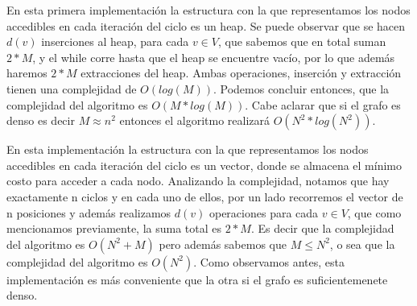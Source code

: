 \pagebreak



En esta primera implementación la estructura con la que representamos los nodos accedibles en cada iteración del ciclo es un heap. 
Se puede observar que se hacen $d(v)$ inserciones al heap, para cada $v \in V$, que sabemos que en total suman $2 * M$, y el while corre hasta que el heap se encuentre vacío, por lo que además haremos $2 * M$ extracciones del heap. Ambas operaciones, inserción y extracción tienen una complejidad de $O(log(M))$. Podemos concluir entonces, que la complejidad del algoritmo es $O(M * log(M))$.
Cabe aclarar que si el grafo es denso es decir $M \approx n^2$ entonces el algoritmo realizará $O(N^2 * log(N^2))$. 




En esta implementación la estructura con la que representamos los nodos accedibles en cada iteración del ciclo es un vector, donde se almacena el mínimo costo para acceder a cada nodo. 
Analizando la complejidad, notamos que hay exactamente n ciclos y en cada uno de ellos, por un lado recorremos el vector de n posiciones y además realizamos $d(v)$ operaciones para cada $v \in V$, que como mencionamos previamente, la suma total es $2 * M$. Es decir que la complejidad del algoritmo es $O(N^2 + M)$ pero además sabemos que $M \leq N^2$, o sea que la complejidad del algoritmo es $O(N^2)$.
Como observamos antes, esta implementación es más conveniente que la otra si el grafo es suficientemenete denso. 



